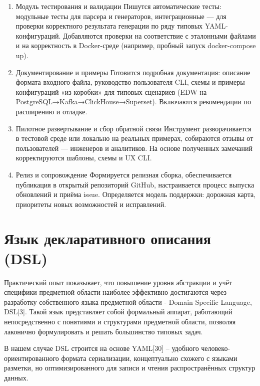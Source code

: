 \begin{enumerate}[label=\textbf{Этап \arabic*.}]
    \item Модуль тестирования и валидации
          Пишутся автоматические тесты: модульные тесты для парсера и генераторов, интеграционные — для проверки корректного результата генерации по ряду типовых YAML-конфигураций. Добавляются проверки на соответствие с эталонными файлами и на корректность в Docker-среде (например, пробный запуск docker-compose up).
    \item Документирование и примеры
          Готовится подробная документация: описание формата входного файла, руководство пользователя CLI, схемы и примеры конфигураций «из коробки» для типовых сценариев (EDW на PostgreSQL→Kafka→ClickHouse→Superset). Включаются рекомендации по расширению и отладке.
    \item Пилотное развертывание и сбор обратной связи
          Инструмент разворачивается в тестовой среде или локально на реальных примерах, собираются отзывы от пользователей — инженеров и аналитиков. На основе полученных замечаний корректируются шаблоны, схемы и UX CLI.
    \item Релиз и сопровождение
          Формируется релизная сборка, обеспечивается публикация в открытый репозиторий GitHub, настраивается процесс выпуска обновлений и приёма issue. Определяется модель поддержки: дорожная карта, приоритеты новых возможностей и исправлений.
\end{enumerate}


\section{Язык декларативного описания (DSL)} \label{ch3:dsl}
Практический опыт показывает, что повышение уровня абстракции и учёт специфики предметной области наиболее эффективно достигаются через разработку собственного языка предметной области - Domain Specific Language, DSL[3]. Такой язык представляет собой формальный аппарат, работающий непосредственно с понятиями и структурами предметной области, позволяя лаконично формулировать и решать большинство типовых задач.

В нашем случае DSL строится на основе YAML[30] – удобного человеко-ориентированного формата сериализации, концептуально схожего с языками разметки, но оптимизированного для записи и чтения распространённых структур данных.



